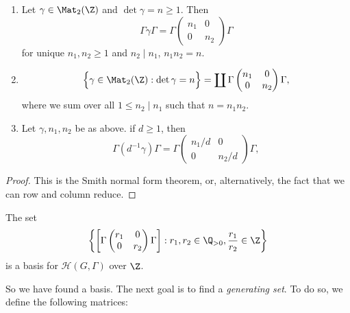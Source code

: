 \documentclass[a4paper]{article}
\begin{document}
\begin{prop}\leavevmode
  \begin{enumerate}
    \item Let $\gamma \in \Mat_2(\Z)$ and $\det \gamma = n \geq 1$. Then
      \[
        \Gamma \gamma \Gamma = \Gamma
        \begin{pmatrix}
          n_1 & 0\\
          0 & n_2
        \end{pmatrix} \Gamma
      \]
      for unique $n_1, n_2 \geq 1$ and $n_2 \mid n_1$, $n_1 n_2 = n$.
    \item
      \[
        \Big\{\gamma \in \Mat_2(\Z) : \det \gamma = n\Big\} = \coprod \Gamma \begin{pmatrix}
          n_1 & 0\\
          0 & n_2
        \end{pmatrix} \Gamma,
      \]
      where we sum over all $1 \leq n_2 \mid n_1$ such that $n = n_1 n_2$.
    \item Let $\gamma, n_1, n_2$ be as above. if $d \geq 1$, then
      \[
        \Gamma (d^{-1}\gamma) \Gamma = \Gamma \begin{pmatrix}
          n_1/d & 0\\
          0 & n_2/d
        \end{pmatrix} \Gamma,
      \]
  \end{enumerate}
\end{prop}

\begin{proof}
  This is the Smith normal form theorem, or, alternatively, the fact that we can row and column reduce.
\end{proof}

\begin{cor}
  The set
  \[
    \left\{\left[\Gamma
      \begin{pmatrix}
        r_1 & 0\\
        0 & r_2
    \end{pmatrix} \Gamma\right] : r_1, r_2 \in \Q_{>0}, \frac{r_1}{r_2} \in \Z \right\}
  \]
  is a basis for $\mathcal{H}(G, \Gamma)$ over $\Z$.
\end{cor}

So we have found a basis. The next goal is to find a \emph{generating set}. To do so, we define the following matrices:
\end{document}
